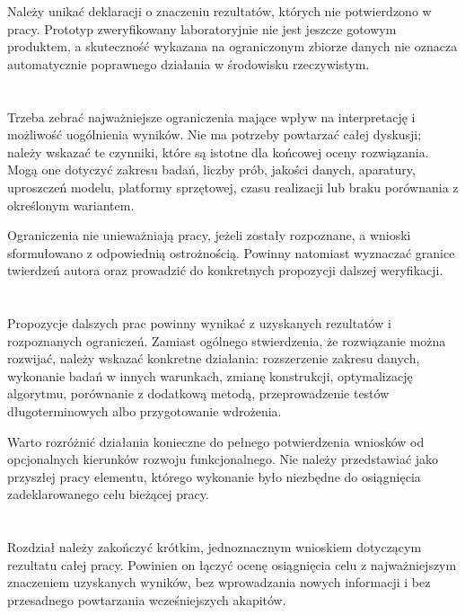 Należy unikać deklaracji o znaczeniu rezultatów, których nie potwierdzono w pracy. Prototyp zweryfikowany laboratoryjnie nie jest jeszcze gotowym produktem, a skuteczność wykazana na ograniczonym zbiorze danych nie oznacza automatycznie poprawnego działania w środowisku rzeczywistym.

\section{}

Trzeba zebrać najważniejsze ograniczenia mające wpływ na interpretację i możliwość uogólnienia wyników. Nie ma potrzeby powtarzać całej dyskusji; należy wskazać te czynniki, które są istotne dla końcowej oceny rozwiązania. Mogą one dotyczyć zakresu badań, liczby prób, jakości danych, aparatury, uproszczeń modelu, platformy sprzętowej, czasu realizacji lub braku porównania z określonym wariantem.

Ograniczenia nie unieważniają pracy, jeżeli zostały rozpoznane, a wnioski sformułowano z odpowiednią ostrożnością. Powinny natomiast wyznaczać granice twierdzeń autora oraz prowadzić do konkretnych propozycji dalszej weryfikacji.

\section{}

Propozycje dalszych prac powinny wynikać z uzyskanych rezultatów i rozpoznanych ograniczeń. Zamiast ogólnego stwierdzenia, że rozwiązanie można rozwijać, należy wskazać konkretne działania: rozszerzenie zakresu danych, wykonanie badań w innych warunkach, zmianę konstrukcji, optymalizację algorytmu, porównanie z dodatkową metodą, przeprowadzenie testów długoterminowych albo przygotowanie wdrożenia.

Warto rozróżnić działania konieczne do pełnego potwierdzenia wniosków od opcjonalnych kierunków rozwoju funkcjonalnego. Nie należy przedstawiać jako przyszłej pracy elementu, którego wykonanie było niezbędne do osiągnięcia zadeklarowanego celu bieżącej pracy.

\section{}

Rozdział należy zakończyć krótkim, jednoznacznym wnioskiem dotyczącym rezultatu całej pracy. Powinien on łączyć ocenę osiągnięcia celu z najważniejszym znaczeniem uzyskanych wyników, bez wprowadzania nowych informacji i bez przesadnego powtarzania wcześniejszych akapitów.
